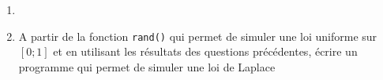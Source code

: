 {\begin{enumerate}
{			Par application du théorème des probabilités totales au système d'événements $\{(X=1), (X=-1)\}$, 
			$$F_U(t) = \PP(X=1,Y \leq e^{\lambda t}) + \PP(X=-1,Y \geq e^{-\lambda t})$$
			D'après le calcul précédent, on obtient 
			$$F_U(t) =   \begin{cases} 1-\frac{1}{2} e^{-\lambda t} \text{ si } t>0 \\ \frac{1}{2} e^{\lambda t} \text{ sinon}\end{cases} $$ }
		\item {}
		\item A partir de la fonction \texttt{rand()} qui permet de simuler une loi uniforme sur $[0;1]$ et en utilisant les résultats des questions précédentes, écrire un programme qui permet de simuler une loi de Laplace 
	\end{enumerate}
}

